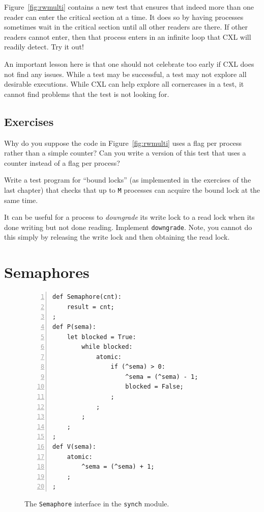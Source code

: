 \documentclass{report}
\newenvironment{code}{
\tcolorbox
}{
\endtcolorbox
}
\begin{document}
Figure~\ref{fig:rwmulti} contains a new test that ensures that indeed more
than one reader can enter the critical section at a time.  It does so by
having processes sometimes wait in the critical section until all other readers
are there.  If other readers cannot enter, then that process enters in an
infinite loop that CXL will readily detect.  Try it out!

An important lesson here is that one should not celebrate too early if CXL
does not find any issues.  While a test may be successful, a test may not
explore all desirable executions.  While CXL can help explore all cornercases
in a test, it cannot find problems that the test is not looking for.

\section*{Exercises}
\begin{problems}
\item Why do you suppose the code in Figure~\ref{fig:rwmulti} uses a flag
per process rather than a simple counter?
Can you write a version of this test that uses a counter instead
of a flag per process?
\item Write a test program for ``bound locks'' (as implemented in the
exercises of the last chapter) that checks that up to \texttt{M} processes
can acquire the bound lock at the same time.
\item It can be useful for a process to \emph{downgrade} its write lock
to a read lock when its done writing but not done reading.  Implement
\texttt{downgrade}.  Note, you cannot do this simply by releasing the
write lock and then obtaining the read lock.
\end{problems}

\chapter{Semaphores}
\label{ch:semaphore}

\begin{figure}
\begin{code}
\begin{Verbatim}[xleftmargin=5mm,numbers=left]
def Semaphore(cnt):
    result = cnt;
;
def P(sema):
    let blocked = True:
        while blocked:
            atomic:
                if (^sema) > 0:
                    ^sema = (^sema) - 1;
                    blocked = False;
                ;
            ;
        ;
    ;
;
def V(sema):
    atomic:
        ^sema = (^sema) + 1;
    ;
;
\end{Verbatim}
\end{code}
\caption{The \texttt{Semaphore} interface in the \texttt{synch} module.}
\label{fig:semaphore}
\end{figure}
\end{document}
